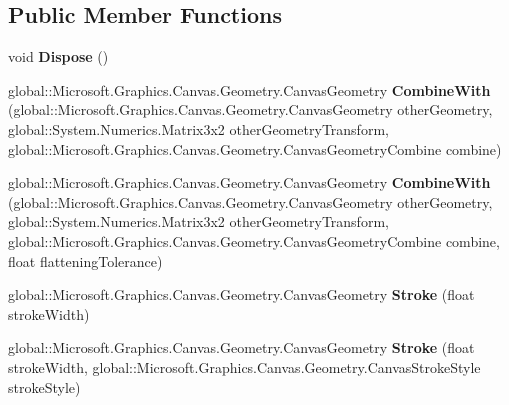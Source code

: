 \subsection*{Public Member Functions}
\begin{DoxyCompactItemize}
\item 
\mbox{\label{class_microsoft_1_1_graphics_1_1_canvas_1_1_geometry_1_1_canvas_geometry_a6173265c5e6f97788ac9715a18ee8b03}} 
void {\bfseries Dispose} ()
\item 
\mbox{\label{class_microsoft_1_1_graphics_1_1_canvas_1_1_geometry_1_1_canvas_geometry_aaf62c4106c1df76395cb0e89a2663f79}} 
global\+::\+Microsoft.\+Graphics.\+Canvas.\+Geometry.\+Canvas\+Geometry {\bfseries Combine\+With} (global\+::\+Microsoft.\+Graphics.\+Canvas.\+Geometry.\+Canvas\+Geometry other\+Geometry, global\+::\+System.\+Numerics.\+Matrix3x2 other\+Geometry\+Transform, global\+::\+Microsoft.\+Graphics.\+Canvas.\+Geometry.\+Canvas\+Geometry\+Combine combine)
\item 
\mbox{\label{class_microsoft_1_1_graphics_1_1_canvas_1_1_geometry_1_1_canvas_geometry_adad804adc3470601bc8179651be8521e}} 
global\+::\+Microsoft.\+Graphics.\+Canvas.\+Geometry.\+Canvas\+Geometry {\bfseries Combine\+With} (global\+::\+Microsoft.\+Graphics.\+Canvas.\+Geometry.\+Canvas\+Geometry other\+Geometry, global\+::\+System.\+Numerics.\+Matrix3x2 other\+Geometry\+Transform, global\+::\+Microsoft.\+Graphics.\+Canvas.\+Geometry.\+Canvas\+Geometry\+Combine combine, float flattening\+Tolerance)
\item 
\mbox{\label{class_microsoft_1_1_graphics_1_1_canvas_1_1_geometry_1_1_canvas_geometry_a8af3ce8304eae3ecf06add5210d5b498}} 
global\+::\+Microsoft.\+Graphics.\+Canvas.\+Geometry.\+Canvas\+Geometry {\bfseries Stroke} (float stroke\+Width)
\item 
\mbox{\label{class_microsoft_1_1_graphics_1_1_canvas_1_1_geometry_1_1_canvas_geometry_aa6cb309b9284fbf870333f012b0bdf86}} 
global\+::\+Microsoft.\+Graphics.\+Canvas.\+Geometry.\+Canvas\+Geometry {\bfseries Stroke} (float stroke\+Width, global\+::\+Microsoft.\+Graphics.\+Canvas.\+Geometry.\+Canvas\+Stroke\+Style stroke\+Style)

\end{DoxyCompactItemize}
